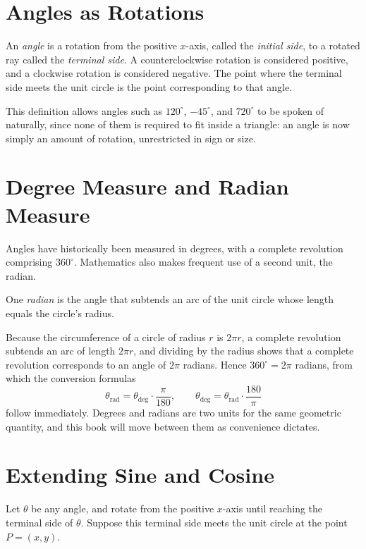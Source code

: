 \section{Angles as Rotations}

\begin{definition}
An \emph{angle} is a rotation from the positive $x$-axis, called the
\emph{initial side}, to a rotated ray called the \emph{terminal side}. A
counterclockwise rotation is considered positive, and a clockwise rotation
is considered negative. The point where the terminal side meets the unit
circle is the point corresponding to that angle.
\end{definition}

This definition allows angles such as $120^\circ$, $-45^\circ$, and
$720^\circ$ to be spoken of naturally, since none of them is required to fit
inside a triangle: an angle is now simply an amount of rotation, unrestricted
in sign or size.

\section{Degree Measure and Radian Measure}

Angles have historically been measured in degrees, with a complete
revolution comprising $360^\circ$. Mathematics also makes frequent use of a
second unit, the radian.

\begin{definition}
One \emph{radian} is the angle that subtends an arc of the unit circle whose
length equals the circle's radius.
\end{definition}

Because the circumference of a circle of radius $r$ is $2\pi r$, a complete
revolution subtends an arc of length $2\pi r$, and dividing by the radius
shows that a complete revolution corresponds to an angle of $2\pi$ radians.
Hence $360^\circ = 2\pi$ radians, from which the conversion formulas
\[
\theta_{\text{rad}} = \theta_{\text{deg}}\cdot\frac{\pi}{180}, \qquad
\theta_{\text{deg}} = \theta_{\text{rad}}\cdot\frac{180}{\pi}
\]
follow immediately. Degrees and radians are two units for the same
geometric quantity, and this book will move between them as convenience
dictates.

\section{Extending Sine and Cosine}

Let $\theta$ be any angle, and rotate from the positive $x$-axis until
reaching the terminal side of $\theta$. Suppose this terminal side meets the
unit circle at the point $P = (x,y)$.

